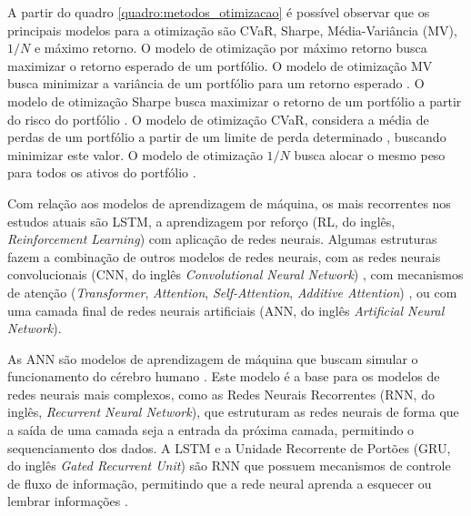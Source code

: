             \ipar A partir do quadro \ref{quadro:metodos_otimizacao} é possível observar que os principais modelos para a otimização são \acrshort{CVaR}, Sharpe, Média-Variância (\acrshort{MV}), $1/N$ e máximo retorno. O modelo de otimização por máximo retorno busca maximizar o retorno esperado de um portfólio. O modelo de otimização \acrshort{MV} busca minimizar a variância de um portfólio para um retorno esperado \cite{markowitz1952portfolio}. O modelo de otimização Sharpe busca maximizar o retorno de um portfólio a partir do risco do portfólio \cite{sharpe1994sharpe}. O modelo de otimização \acrshort{CVaR}, considera a média de perdas de um portfólio a partir de um limite de perda determinado \cite{uryasev2000conditional}, buscando minimizar este valor. O modelo de otimização $1/N$ busca alocar o mesmo peso para todos os ativos do portfólio \cite{demiguel2009optimal}.

            \ipar Com relação aos modelos de aprendizagem de máquina, os mais recorrentes nos estudos atuais são \acrshort{LSTM}, a aprendizagem por reforço (\acrshort{RL}, do inglês, \textit{Reinforcement Learning}) com aplicação de redes neurais. Algumas estruturas fazem a combinação de outros modelos de redes neurais, com as redes neurais convolucionais (CNN, do inglês \textit{Convolutional Neural Network}) \cite{weng2020portfolio} \cite{daiya2021stock}\cite{chaweewanchon2022markowitz} \cite{gao2022novel}, com mecanismos de atenção (\textit{Transformer}, \textit{Attention}, \textit{Self-Attention}, \textit{Additive Attention})\cite{cao2020delafo} \cite{weng2020portfolio} \cite{daiya2021stock}\cite{leow2021robo} \cite{du2022mean} \cite{kisiel2023portfolio}, ou com uma camada final de redes neurais artificiais (ANN, do inglês \textit{Artificial Neural Network}).

            \ipar As \acrshort{ANN} são modelos de aprendizagem de máquina que buscam simular o funcionamento do cérebro humano \cite{rosenblatt1958perceptron}. Este modelo é a base para os modelos de redes neurais mais complexos, como as Redes Neurais Recorrentes (\acrshort{RNN}, do inglês, \textit{Recurrent Neural Network}), que estruturam as redes neurais de forma que a saída de uma camada seja a entrada da próxima camada, permitindo o sequenciamento dos dados. A \acrshort{LSTM} e a Unidade Recorrente de Portões (\acrshort{GRU}, do inglês \textit{Gated Recurrent Unit}) são \acrshort{RNN} que possuem mecanismos de controle de fluxo de informação, permitindo que a rede neural aprenda a esquecer ou lembrar informações \cite{hochreiter1997long}\cite{cho2014learning}. 

